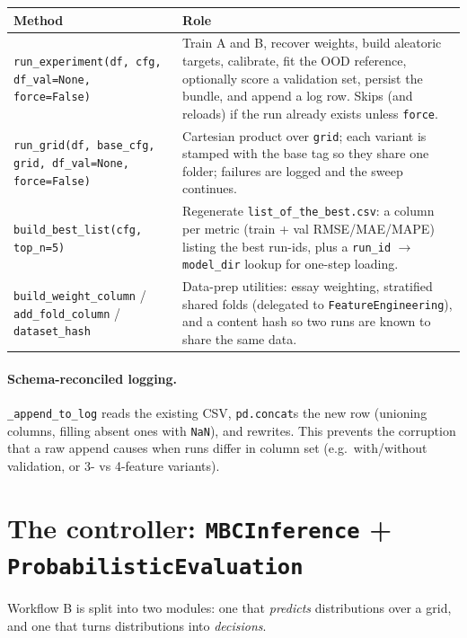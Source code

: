 \documentclass[11pt,a4paper]{article}
\newcommand{\code}[1]{\texttt{\small #1}}
\newcommand{\file}[1]{\texttt{\small #1}}
\begin{document}
\begin{longtable}{@{}p{}p{}@{}}
\toprule
\textbf{Method} & \textbf{Role} \\
\midrule
\endhead
\code{run\_experiment(df, cfg, df\_val=None, force=False)} &
  Train A and B, recover weights, build aleatoric targets, calibrate, fit the
  OOD reference, optionally score a validation set, persist the bundle, and
  append a log row. Skips (and reloads) if the run already exists unless
  \code{force}. \\
\code{run\_grid(df, base\_cfg, grid, df\_val=None, force=False)} &
  Cartesian product over \code{grid}; each variant is stamped with the base tag
  so they share one folder; failures are logged and the sweep continues. \\
\code{build\_best\_list(cfg, top\_n=5)} &
  Regenerate \file{list\_of\_the\_best.csv}: a column per metric (train + val
  RMSE/MAE/MAPE) listing the best run-ids, plus a \code{run\_id} $\rightarrow$
  \code{model\_dir} lookup for one-step loading. \\
\code{build\_weight\_column} / \code{add\_fold\_column} / \code{dataset\_hash} &
  Data-prep utilities: essay weighting, stratified shared folds (delegated to
  \code{FeatureEngineering}), and a content hash so two runs are known to share
  the same data. \\
\bottomrule
\end{longtable}

\paragraph{Schema-reconciled logging.} \code{\_append\_to\_log} reads the
existing CSV, \code{pd.concat}s the new row (unioning columns, filling absent
ones with \code{NaN}), and rewrites. This prevents the corruption that a raw
append causes when runs differ in column set (e.g.\ with/without validation, or
3- vs 4-feature variants).

\section{The controller: \code{MBCInference} + \code{ProbabilisticEvaluation}}

Workflow B is split into two modules: one that \emph{predicts} distributions
over a grid, and one that turns distributions into \emph{decisions}.
\end{document}
